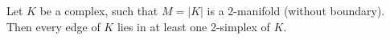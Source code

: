 Let $K$ be a complex, such that $M = |K|$ is a 2-manifold (without boundary). Then every edge of $K$ lies in at least one 2-simplex of $K$.
